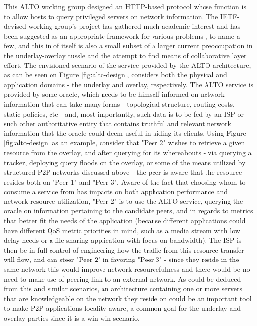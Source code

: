         This ALTO working group designed an HTTP-based protocol whose function is to allow hosts to query privileged servers on network information.
        The IETF-devised working group's project has gathered much academic interest \cite{seedorf2009} \cite{provider-aided-cdn} \cite{sampaio2018} \cite{liao2014} \cite{dan-Commag10} and has been suggested as an appropriate framework for various problems \cite{fps-12} \cite{pfa-10} \cite{wichtlhuber2017} \cite{cdni-problem-statement}, to name a few, and this in of itself is also a small subset of a larger current preoccupation in the underlay-overlay tussle and the attempt to find means of collaborative layer effort.
        The envisioned scenario of the service provided by the ALTO architecture, as can be seen on Figure \ref{fig:alto-design}, considers both the physical and application domains - the underlay and overlay, respectively.
        The ALTO service is provided by some oracle, which needs to be himself informed on network information that can take many forms - topological structure, routing costs, static policies, etc - and, most importantly, such data is to be fed by an ISP or such other authoritative entity that contains truthful and relevant network information that the oracle could deem useful in aiding its clients.
        Using Figure \ref{fig:alto-design} as an example, consider that "Peer 2" wishes to retrieve a given resource from the overlay, and after querying for its whereabouts - via querying a tracker, deploying query floods on the overlay, or some of the means utilized by structured P2P networks discussed above - the peer is aware that the resource resides both on "Peer 1" and "Peer 3".
        Aware of the fact that choosing whom to consume a service from has impacts on both application performance and network resource utilization, "Peer 2" is to use the ALTO service, querying the oracle on information pertaining to the candidate peers, and in regards to metrics that better fit the needs of the application (because different applications could have different QoS metric priorities in mind, such as a media stream with low delay needs or a file sharing application with focus on bandwidth).
        The ISP is then be in full control of engineering how the traffic from this resource transfer will flow, and can steer "Peer 2" in favoring "Peer 3" - since they reside in the same network this would improve network resourcefulness and there would be no need to make use of peering link to an external network.
        As could be deduced from this and similar scenarios, an architecture containing one or more servers that are knowledgeable on the network they reside on could be an important tool to make P2P applications locality-aware, a common goal for the underlay and overlay parties since it is a win-win scenario.

